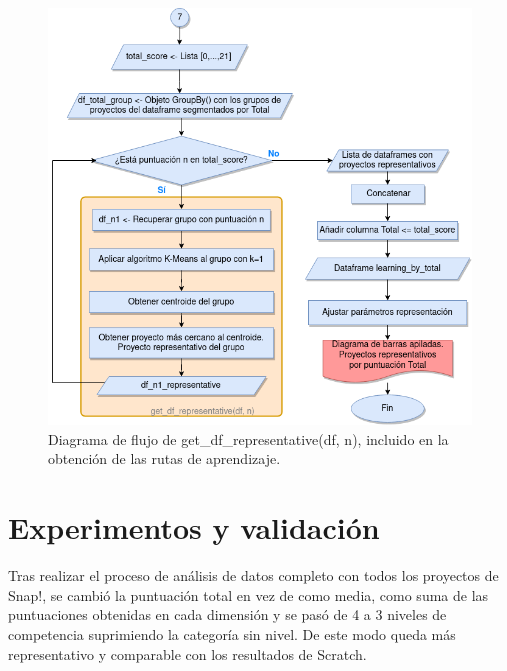 \documentclass[a4paper, 12pt]{book}
\begin{document}
\begin{figure}
    \centering
    \includegraphics[height=.6\textheight]{img/ruta_de_aprendizajeCaja.png}
    \caption{Diagrama de flujo de get\_df\_representative(df, n), incluido en la obtención de las rutas de aprendizaje.}\label{fig:diagrama_rutas}
\end{figure}



\cleardoublepage
\chapter{Experimentos y validación}
\label{chap:experimentos}

Tras realizar el proceso de análisis de datos completo con todos los proyectos de Snap!, se cambió la puntuación total en vez de como media, como suma de las puntuaciones obtenidas en cada dimensión y se pasó de 4 a 3 niveles de competencia suprimiendo la categoría sin nivel. De este modo queda más representativo y comparable con los resultados de Scratch.
\end{document}

